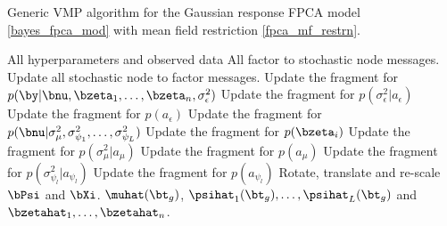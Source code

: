 \documentclass[12pt]{article}
\def\sigsqeps{\sigma^2_{\epsilon}}
\def\aeps{a_{\epsilon}}
\def\sigsqmu{\sigma^2_{\mu}}
\def\amu{a_{\mu}}
\newcommand\sigsqpsi[1]{\sigma^2_{\psi_{#1}}}
\newcommand\apsi[1]{a_{\psi_{#1}}}
\theoremstyle{plain}
\theoremstyle{definition}
\theoremstyle{remark}
\begin{document}
\begin{algorithm}
	\caption{
		Generic VMP algorithm for the Gaussian response FPCA model \eqref{bayes_fpca_mod} with
		mean field restriction \eqref{fpca_mf_restrn}.
	}
	\label{alg:vmp_alg}
	\begin{algorithmic}[1]
		\Inputs All hyperparameters and observed data
		\Initialize All factor to stochastic node messages.
		\Updates
				\State Update all stochastic node to factor messages.
				\State Update the fragment for $p (\by | \bnu, \bzeta_1, \dots, \bzeta_n, \sigsqeps)$
				\State Update the fragment for $p (\sigsqeps | \aeps)$
				\State Update the fragment for $p (\aeps)$
				\State Update the fragment for $p (\bnu | \sigsqmu, \sigsqpsi{1}, \dots, \sigsqpsi{L})$
					\State Update the fragment for $p (\bzeta_i)$
				\EndFor
				\State Update the fragment for $p (\sigsqmu | \amu)$
				\State Update the fragment for $p (\amu)$
					\State Update the fragment for $p (\sigsqpsi{l} | \apsi{l})$
					\State Update the fragment for $p (\apsi{l})$
				\EndFor
			\EndWhile
			\State Rotate, translate and re-scale $\bPsi$ and $\bXi$.
		\Outputs $\muhat (\bt_g)$, $\psihat_1 (\bt_g), \dots, \psihat_L (\bt_g)$ and $\bzetahat_1, \dots, \bzetahat_n$.
	\end{algorithmic}
\end{algorithm}
\end{document}
